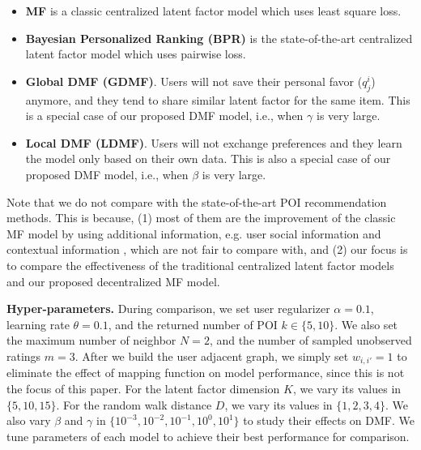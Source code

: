 \begin{itemize}[leftmargin=*] \setlength{\itemsep}{-\itemsep}
    \item \textbf{MF} \cite{mnih2007probabilistic} is a classic centralized latent factor model which uses least square loss. 
    \item \textbf{Bayesian Personalized Ranking (BPR)} \cite{rendle2009bpr} is the state-of-the-art centralized latent factor model which uses pairwise loss. 
    \item \textbf{Global DMF (GDMF)}. Users will not save their personal favor ($q^i_j$) anymore, and they tend to share similar latent factor for the same item. This is a special case of our proposed DMF model, i.e., when $\gamma$ is very large. 
    \item \textbf{Local DMF (LDMF)}. Users will not exchange preferences and they learn the model only based on their own data. This is also a special case of our proposed DMF model, i.e., when $\beta$ is very large. 
\end{itemize}

Note that we do not compare with the state-of-the-art POI recommendation methods. This is because, (1) most of them are the improvement of the classic MF model by using additional information, e.g. user social information and contextual information \cite{cheng2012fused,yang2013sentiment,gao2015content}, which are not fair to compare with, and 
(2) our focus is to compare the effectiveness of the traditional centralized latent factor models and our proposed decentralized MF model. 

\textbf{Hyper-parameters.} 
During comparison, we set user regularizer $\alpha=0.1$, learning rate $\theta=0.1$, and the returned number of POI $k \in \{5,10\}$. 
We also set the maximum number of neighbor $N=2$, and the number of sampled unobserved ratings $m=3$. 
After we build the user adjacent graph, we simply set $w_{i,i'}=1$ to eliminate the effect of mapping function on model performance, since this is not the focus of this paper. 
For the latent factor dimension $K$, we vary its values in $\{5,10,15\}$. 
For the random walk distance $D$, we vary its values in $\{1,2,3,4\}$. 
We also vary $\beta$ and $\gamma$ in $\{10^{-3},10^{-2},10^{-1},10^{0},10^{1}\}$ to study their effects on DMF. 
We tune parameters of each model to achieve their best performance for comparison. 

